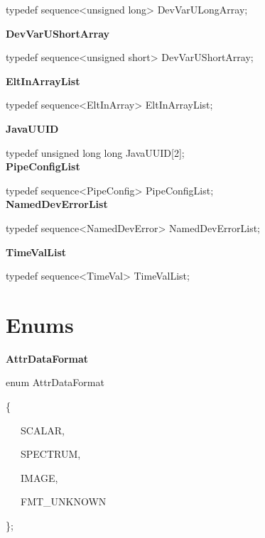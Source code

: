 typedef sequence<unsigned long> DevVarULongArray;\\


\begin{flushleft}
\textbf{DevVarUShortArray}
\par\end{flushleft}

typedef sequence<unsigned short> DevVarUShortArray;\\


\begin{flushleft}
\textbf{EltInArrayList}
\par\end{flushleft}

typedef sequence<EltInArray> EltInArrayList;\textbf{}\\


\begin{flushleft}
\textbf{JavaUUID}
\par\end{flushleft}

typedef unsigned long long JavaUUID{[}2{]};\\


\textbf{PipeConfigList}

typedef sequence<PipeConfig> PipeConfigList;\\


\textbf{NamedDevErrorList}

typedef sequence<NamedDevError> NamedDevErrorList;\\


\begin{flushleft}
\textbf{TimeValList}
\par\end{flushleft}

typedef sequence<TimeVal> TimeValList;\textbf{}\\



\section{Enums}

\textbf{AttrDataFormat}

enum AttrDataFormat

\{

~~~SCALAR,

~~~SPECTRUM,

~~~IMAGE,

~~~FMT\_UNKNOWN

\};\\



